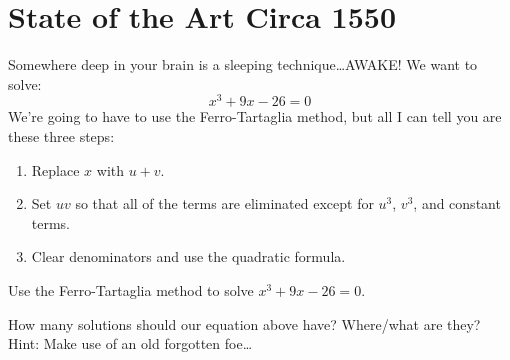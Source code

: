 \newpage
\section{State of the Art Circa 1550}	

Somewhere deep in your brain is a sleeping technique\dots AWAKE!
We want to solve:
\[
x^3 + 9x -26 =0
\]
We're going to have to use the Ferro-Tartaglia method, but all I can tell you are these three steps:
\begin{enumerate}
\item Replace $x$ with $u+v$. 
\item Set $uv$ so that all of the terms are eliminated except for $u^3$,
$v^3$, and constant terms.  
\item Clear denominators and use the quadratic formula.
\end{enumerate}


\begin{prob}
Use the Ferro-Tartaglia method to solve $x^3 + 9x -26 =0$.
\end{prob}


\begin{prob}
How many solutions should our equation above have? Where/what are they?
Hint: Make use of an old forgotten foe\dots
\end{prob}
